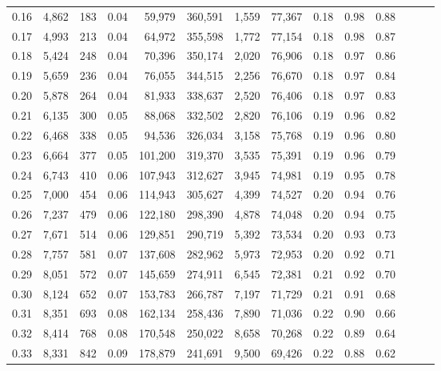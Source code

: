 \begin{tabular}{rrrrrrrrrrrrrr}
0.16 &   4,862 &    183 &  0.04 &   59,979 &  360,591 &   1,559 &  77,367 &  0.18 &  0.98 &      0.88 \\
0.17 &   4,993 &    213 &  0.04 &   64,972 &  355,598 &   1,772 &  77,154 &  0.18 &  0.98 &      0.87 \\
0.18 &   5,424 &    248 &  0.04 &   70,396 &  350,174 &   2,020 &  76,906 &  0.18 &  0.97 &      0.86 \\
0.19 &   5,659 &    236 &  0.04 &   76,055 &  344,515 &   2,256 &  76,670 &  0.18 &  0.97 &      0.84 \\
0.20 &   5,878 &    264 &  0.04 &   81,933 &  338,637 &   2,520 &  76,406 &  0.18 &  0.97 &      0.83 \\
0.21 &   6,135 &    300 &  0.05 &   88,068 &  332,502 &   2,820 &  76,106 &  0.19 &  0.96 &      0.82 \\
0.22 &   6,468 &    338 &  0.05 &   94,536 &  326,034 &   3,158 &  75,768 &  0.19 &  0.96 &      0.80 \\
0.23 &   6,664 &    377 &  0.05 &  101,200 &  319,370 &   3,535 &  75,391 &  0.19 &  0.96 &      0.79 \\
0.24 &   6,743 &    410 &  0.06 &  107,943 &  312,627 &   3,945 &  74,981 &  0.19 &  0.95 &      0.78 \\
0.25 &   7,000 &    454 &  0.06 &  114,943 &  305,627 &   4,399 &  74,527 &  0.20 &  0.94 &      0.76 \\
0.26 &   7,237 &    479 &  0.06 &  122,180 &  298,390 &   4,878 &  74,048 &  0.20 &  0.94 &      0.75 \\
0.27 &   7,671 &    514 &  0.06 &  129,851 &  290,719 &   5,392 &  73,534 &  0.20 &  0.93 &      0.73 \\
0.28 &   7,757 &    581 &  0.07 &  137,608 &  282,962 &   5,973 &  72,953 &  0.20 &  0.92 &      0.71 \\
0.29 &   8,051 &    572 &  0.07 &  145,659 &  274,911 &   6,545 &  72,381 &  0.21 &  0.92 &      0.70 \\
0.30 &   8,124 &    652 &  0.07 &  153,783 &  266,787 &   7,197 &  71,729 &  0.21 &  0.91 &      0.68 \\
0.31 &   8,351 &    693 &  0.08 &  162,134 &  258,436 &   7,890 &  71,036 &  0.22 &  0.90 &      0.66 \\
0.32 &   8,414 &    768 &  0.08 &  170,548 &  250,022 &   8,658 &  70,268 &  0.22 &  0.89 &      0.64 \\
0.33 &   8,331 &    842 &  0.09 &  178,879 &  241,691 &   9,500 &  69,426 &  0.22 &  0.88 &      0.62 \\

\end{tabular}
